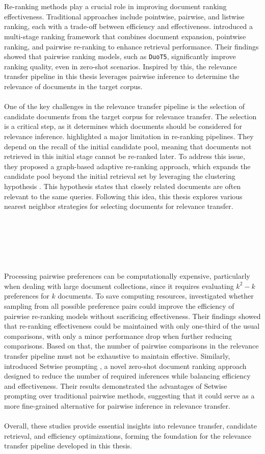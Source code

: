 \\\\
Re-ranking methods play a crucial role in improving document ranking effectiveness. Traditional approaches include pointwise, pairwise, and listwise ranking, each with a trade-off between efficiency and effectiveness. \citet{pradeep:2021} introduced a multi-stage ranking framework that combines document expansion, pointwise ranking, and pairwise re-ranking to enhance retrieval performance. Their findings showed that pairwise ranking models, such as \texttt{DuoT5}, significantly improve ranking quality, even in zero-shot scenarios. Inspired by this, the relevance transfer pipeline in this thesis leverages pairwise inference to determine the relevance of documents in the target corpus.
\\\\
One of the key challenges in the relevance transfer pipeline is the selection of candidate documents from the target corpus for relevance transfer. The selection is a critical step, as it determines which documents should be considered for relevance inference. \citet{macavaney:2022} highlighted a major limitation in re-ranking pipelines. They depend on the recall of the initial candidate pool, meaning that documents not retrieved in this initial stage cannot be re-ranked later. To address this issue, they proposed a graph-based adaptive re-ranking approach, which expands the candidate pool beyond the initial retrieval set by leveraging the clustering hypothesis \mbox{\citep{jardine:1971}}. This hypothesis states that closely related documents are often relevant to the same queries. Following this idea, this thesis explores various nearest neighbor strategies for selecting documents for relevance transfer.
\\\\\\\\\\\\\\
Processing pairwise preferences can be computationally expensive, particularly when dealing with large document collections, since it requires evaluating $k^2-k$ preferences for $k$ documents. To save computing resources, \mbox{\citet{gienapp:2022}} investigated whether sampling from all possible preference pairs could improve the efficiency of pairwise re-ranking models without sacrificing effectiveness. Their findings showed that re-ranking effectiveness could be maintained with only one-third of the usual comparisons, with only a minor performance drop when further reducing comparisons. Based on that, the number of pairwise comparisons in the relevance transfer pipeline must not be exhaustive to maintain effective. Similarly, \citet{zhuang:2024} introduced \glqq Setwise prompting \grqq{}, a novel zero-shot document ranking approach designed to reduce the number of required inferences while balancing efficiency and effectiveness. Their results demonstrated the advantages of Setwise prompting over traditional pairwise methods, suggesting that it could serve as a more fine-grained alternative for pairwise inference in relevance transfer.
\\\\
Overall, these studies provide essential insights into relevance transfer, candidate retrieval, and efficiency optimizations, forming the foundation for the relevance transfer pipeline developed in this thesis.